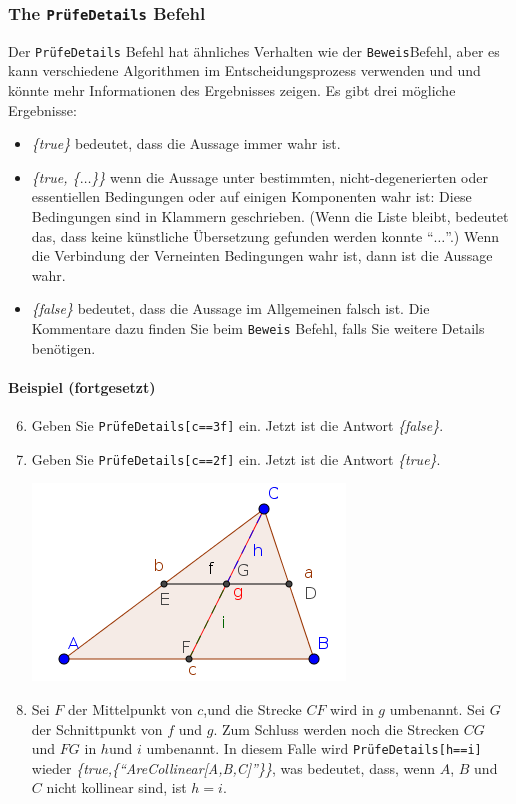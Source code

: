 \documentclass{article}
\begin{document}
\subsubsection{The \texttt{PrüfeDetails} Befehl}
Der \texttt{PrüfeDetails} Befehl hat ähnliches Verhalten wie der \texttt{Beweis}Befehl, aber es kann verschiedene Algorithmen im Entscheidungsprozess verwenden und und könnte mehr Informationen des Ergebnisses zeigen. Es gibt drei mögliche Ergebnisse:
\begin{itemize}
    \item \textit{\{true\}} bedeutet, dass die Aussage immer wahr ist.
    \item \textit{\{true, \{$\ldots$\}\}} wenn die Aussage unter bestimmten, nicht-degenerierten \cite{Chou} oder essentiellen \cite{KovacsRecioSolyomGecse} Bedingungen oder auf einigen Komponenten \cite{ZhouWangSun} wahr ist: Diese Bedingungen sind in Klammern geschrieben. (Wenn die Liste bleibt, bedeutet das, dass keine künstliche Übersetzung gefunden werden konnte ``$\ldots$''.) Wenn die Verbindung der Verneinten Bedingungen wahr ist, dann ist die Aussage wahr.
    \item \textit{\{false\}} bedeutet, dass die Aussage im Allgemeinen falsch ist. Die Kommentare dazu finden Sie beim \texttt{Beweis} Befehl, falls Sie weitere Details benötigen.
\end{itemize}
\paragraph{Beispiel (fortgesetzt)}
\begin{enumerate}
\setcounter{enumi}{5}
    \item Geben Sie \texttt{PrüfeDetails[c==3f]} ein. Jetzt ist die Antwort \textit{\{false\}}.
    \item Geben Sie \texttt{PrüfeDetails[c==2f]} ein. Jetzt ist die Antwort \textit{\{true\}}.
\begin{center}
\includegraphics[scale=0.5]{ProveDetails-example-1}
\end{center}
    \item Sei $F$ der Mittelpunkt von $c$,und die Strecke $CF$ wird in $g$ umbenannt. Sei $G$ der Schnittpunkt von $f$ und $g$. Zum Schluss werden noch die Strecken $CG$ und $FG$ in $h$und $i$ umbenannt. In diesem Falle wird \texttt{PrüfeDetails[h==i]} wieder \textit{\{true,\{``AreCollinear[A,B,C]''\}\}}, was bedeutet, dass, wenn $A$, $B$ und $C$ nicht kollinear sind, ist $h=i$.
\end{enumerate}
\end{document}
